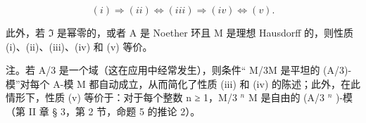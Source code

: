 \[
(i) \Rightarrow (i i) \Leftrightarrow (i i i) \Rightarrow (i v) \Leftrightarrow (v).
\]

此外，若 \(\mathfrak{I}\) 是幂零的，或者 A 是 Noether 环且 M 是理想 Hausdorff 的，则性质 (i)、(ii)、(iii)、(iv) 和 (v) 等价。

注。若 A/3 是一个域（这在应用中经常发生），则条件“ M/3M 是平坦的 (A/3)-模”对每个 A-模 M 都自动成立，从而简化了性质 (iii) 和 (iv) 的陈述；此外，在此情形下，性质 (v) 等价于：对于每个整数 n ≥ 1，M/3 \(^{n}\) M 是自由的 (A/3 \(^{n}\) )-模（第 II 章 § 3，第 2 节，命题 5 的推论 2）。

